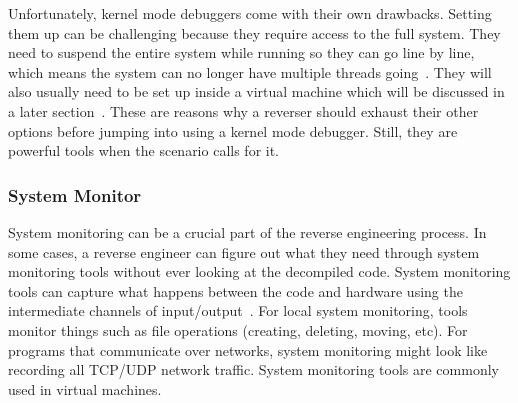 Unfortunately, kernel mode debuggers come with their own drawbacks. 
Setting them up can be challenging because they require access to the full system. 
They need to suspend the entire system while running so they can go line by line, which means the system can no longer have multiple threads going~\cite{Reversing}. 
They will also usually need to be set up inside a virtual machine which will be discussed in a later section~\cite{PracticalRE}. 
These are reasons why a reverser should exhaust their other options before jumping into using a kernel mode debugger. 
Still, they are powerful tools when the scenario calls for it.

\subsubsection{System Monitor}
System monitoring can be a crucial part of the reverse engineering process. 
In some cases, a reverse engineer can figure out what they need through system monitoring tools without ever looking at the decompiled code. 
System monitoring tools can capture what happens between the code and hardware using the intermediate channels of input/output~\cite{Reversing}. 
For local system monitoring, tools monitor things such as file operations (creating, deleting, moving, etc). 
For programs that communicate over networks, system monitoring might look like recording all TCP/UDP network traffic. 
System monitoring tools are commonly used in virtual machines.


